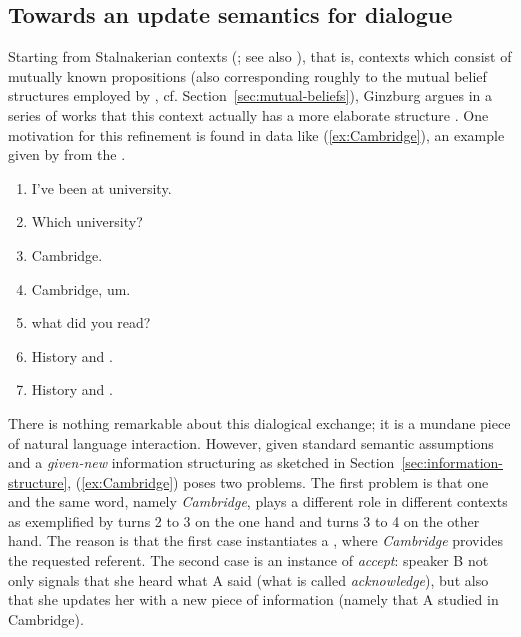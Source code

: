 \documentclass[output=paper
	        ,collection
	        ,collectionchapter
 	        ,biblatex
                ,babelshorthands
                ,newtxmath
                ,draftmode
                ,colorlinks, citecolor=brown
]{langscibook}
\begin{document}
\subsection{Towards an update semantics for dialogue}
\label{sec:dialogue-game-boards}

Starting from Stalnakerian contexts  (\citealp{Stalnaker:1978}; see also \citealp{Lewis:1979:b}), that is, contexts which consist of mutually known propositions (also corresponding roughly to the mutual belief structures employed by \citealp{Green:1996}, cf. Section~\ref{sec:mutual-beliefs}), Ginzburg argues in a series of works that this context actually has a more elaborate structure \citep{Ginzburg:1994,Ginzburg:1996,Ginzburg:1997}.
%
One motivation for this refinement is found in data like (\ref{ex:Cambridge}), an
example given by \citet[]{Ginzburg:1994} from the  \citep{Svartvik:1990}.
%
\ea \label{ex:Cambridge}
\begin{enumerate}[noitemsep]
\item {} I've been at university.
\item {} Which university?
\item {} Cambridge.
\item {} Cambridge, um.
\item \speaking{} what did you read?
\item {} History and .
\item {} History and .
\end{enumerate}
\z

There is nothing remarkable about this dialogical exchange; it is a mundane piece of natural language interaction.
%
However, given standard semantic assumptions and a \emph{given-new} information structuring as sketched in Section~\ref{sec:information-structure}, (\ref{ex:Cambridge}) poses two problems.
%
The first problem is that one and the same word, namely \textit{Cambridge}, plays a different role in different contexts as exemplified by turns 2 to 3 on the one hand and turns 3 to 4 on the other hand.
%
The reason is that the first case instantiates a , where \textit{Cambridge} provides the requested referent.
%
The second case is an instance of \emph{accept}:  speaker B not only signals that she heard what A said (what is called \emph{acknowledge}),  but also that she updates  her  with a new piece of information (namely that A studied in Cambridge).
\end{document}
